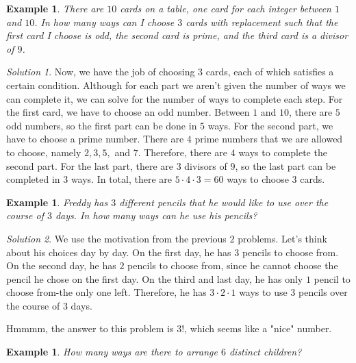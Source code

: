 \documentclass[letterpaper]{article}
\newtheorem{example}[thm]{Example}
\theoremstyle{remark}
\newtheorem*{solution}{Solution}
\theoremstyle{definition}
\begin{document}
\begin{example}

There are $10$ cards on a table, one card for each integer between $1$ and $10$. In how many ways can I choose $3$ cards with replacement such that the first card I choose is odd, the second card is prime, and the third card is a divisor of $9$.
\end{example}

\begin{solution}

Now, we have the job of choosing $3$ cards, each of which satisfies a certain condition. Although for each part we aren't given the number of ways we can complete it, we can solve for the number of ways to complete each step. For the first card, we have to choose an odd number. Between $1$ and $10$, there are $5$ odd numbers, so the first part can be done in $5$ ways. For the second part, we have to choose a prime number. There are $4$ prime numbers that we are allowed to choose, namely $2, 3, 5, $ and $7$. Therefore, there are $4$ ways to complete the second part. For the last part, there are $3$ divisors of $9$, so the last part can be completed in $3$ ways. In total, there are $5\cdot 4 \cdot 3=60$ ways to choose $3$ cards.
\end{solution}


\begin{example}
Freddy has $3$ different pencils that he would like to use over the course of $3$ days. In how many ways can he use his pencils?

\end{example}

\begin{solution}
We use the motivation from the previous $2$ problems. Let's think about his choices day by day. On the first day, he has $3$ pencils to choose from. On the second day, he has $2$ pencils to choose from, since he cannot choose the pencil he chose on the first day. On the third and last day, he has only $1$ pencil to choose from-the only one left. Therefore, he has $3\cdot 2\cdot 1$ ways to use $3$ pencils over the course of $3$ days.
\end{solution}



Hmmmm, the answer to this problem is $3!$, which seems like a "nice" number. 

\begin{example}

How many ways are there to arrange $6$ distinct children?
\end{example}
\end{document}
